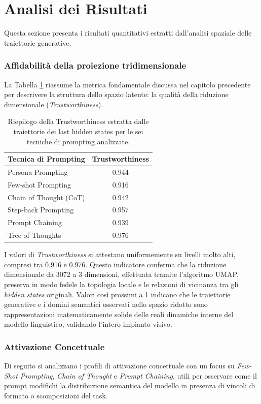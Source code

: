 \section{Analisi dei Risultati}
\label{sec:analisi_risultati}

Questa sezione presenta i risultati quantitativi estratti dall'analisi spaziale delle traiettorie generative. 

\subsubsection*{Affidabilità della proiezione tridimensionale}
La Tabella \ref{tab:risultati_metriche} riassume la metrica fondamentale discussa nel capitolo precedente per descrivere la struttura dello spazio latente: la qualità della riduzione dimensionale (\textit{Trustworthiness}).

\begin{table}[htbp]
\centering
\begin{tabular}{lc}
\hline
\textbf{Tecnica di Prompting} & \textbf{Trustworthiness} \\
\hline
Persona Prompting & 0.944 \\
Few-shot Prompting & 0.916 \\
Chain of Thought (CoT) & 0.942 \\
Step-back Prompting & 0.957 \\
Prompt Chaining & 0.939 \\
Tree of Thoughts & 0.976 \\
\hline
\end{tabular}
\caption{Riepilogo della Trustworthiness estratta dalle traiettorie dei last hidden states per le sei tecniche di prompting analizzate.}
\label{tab:risultati_metriche}
\end{table}

I valori di \textit{Trustworthiness} si attestano uniformemente su livelli molto alti, compresi tra 0.916 e 0.976. Questo indicatore conferma che la riduzione dimensionale da 3072 a 3 dimensioni, effettuata tramite l'algoritmo UMAP, preserva in modo fedele la topologia locale e le relazioni di vicinanza tra gli \textit{hidden states} originali. Valori così prossimi a 1 indicano che le traiettorie generative e i domini semantici osservati nello spazio ridotto sono rappresentazioni matematicamente solide delle reali dinamiche interne del modello linguistico, validando l'intero impianto visivo.


\subsubsection*{Attivazione Concettuale}
Di seguito si analizzano i profili di attivazione concettuale con un focus su \textit{Few-Shot Prompting}, \textit{Chain of Thought} e \textit{Prompt Chaining}, utili per osservare come il prompt modifichi la distribuzione semantica del modello in presenza di vincoli di formato o scomposizioni del task.

